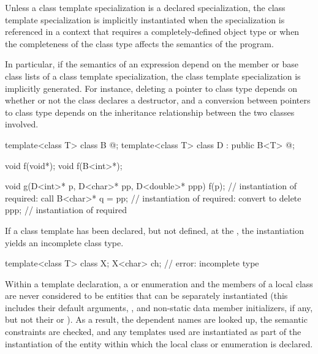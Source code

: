 \pnum
{}%
Unless a class template specialization is a declared specialization,
the class template specialization is implicitly instantiated when the
specialization is referenced in a context that requires a completely-defined
object type or when the completeness of the class type affects the semantics
of the program.
\begin{note}
In particular, if the semantics of an expression depend on the member or
base class lists of a class template specialization, the class template
specialization is implicitly generated. For instance, deleting a pointer
to class type depends on whether or not the class declares a destructor,
and a conversion between pointers to class type depends on the
inheritance relationship between the two classes involved.
\end{note}
\begin{example}
\begin{codeblock}
template<class T> class B { @\commentellip@ };
template<class T> class D : public B<T> { @\commentellip@ };

void f(void*);
void f(B<int>*);

void g(D<int>* p, D<char>* pp, D<double>* ppp) {
  f(p);             // instantiation of  required: call 
  B<char>* q = pp;  // instantiation of  required: convert  to 
  delete ppp;       // instantiation of  required
}
\end{codeblock}
\end{example}
If a class template has been declared, but not defined,
at the ,
the instantiation yields an incomplete class type.
\begin{example}
\begin{codeblock}
template<class T> class X;
X<char> ch;         // error: incomplete type 
\end{codeblock}
\end{example}
\begin{note}
Within a template declaration,
a  or enumeration and the members of
a local class are never considered to be entities that can be separately
instantiated (this includes their default arguments,
, and non-static data member
initializers, if any,
but not their  or ).
As a result, the dependent names are looked up, the
semantic constraints are checked, and any templates used are instantiated as
part of the instantiation of the entity within which the local class or
enumeration is declared.
\end{note}

